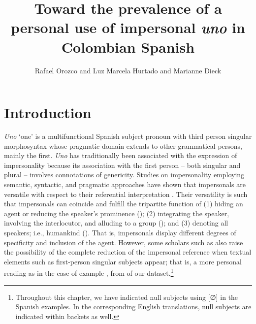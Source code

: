 \documentclass[output=paper]{langscibook}
\author{Rafael Orozco\orcid{0000-0001-9232-0287}\affiliation{Louisiana State University} and Luz Marcela Hurtado\orcid{}\affiliation{Central Michigan University} and Marianne Dieck\orcid{}\affiliation{Universidad de Antioquia}}
\title[Toward the prevalence of a personal use of impersonal \textit{uno} in C.S.]
       {Toward the prevalence of a personal use of impersonal \textit{uno} in Colombian Spanish}
\begin{document}
\maketitle 



\section{Introduction} 


\textit{Uno} ‘one’ is a multifunctional Spanish subject pronoun with third person singular morphosyntax whose pragmatic domain extends to other grammatical persons, mainly the first. \textit{Uno} has traditionally been associated with the expression of impersonality because its association with the first person – both singular and plural – involves connotations of genericity. Studies on impersonality employing semantic, syntactic, and pragmatic approaches have shown that impersonals are versatile with respect to their referential interpretation \parencites[376]{CasiellesSuárez1996}[160]{Hernanz1990}[]{HurtadoGutiérrez-Rivas2016}. Their versatility is such that impersonals can coincide and fulfill the tripartite function of (1) hiding an agent or reducing the speaker’s prominence (\citealt{Barrajón2005, GómezTorrego1992, Haverkate1987, Hernanz1990, HollaenderJensen2002, MuñizCachón1998, RicosVidal2002}); (2) integrating the speaker, involving the interlocutor, and alluding to a group (\citealt{Fernández2008, FernándezRamírez1986, Gelabert-Desnoyer2008, MuñizCachón1998}); and (3) denoting all speakers; i.e., humankind  (\citealt{CompanyPozas2009, FernándezSoriano1999, Siewierska2008}). That is, impersonals display different degrees of specificity and inclusion of the agent. However, some scholars such as \citet[1206]{CompanyPozas2009} also raise the possibility of the complete reduction of the impersonal reference when textual elements such as first-person singular subjects appear; that is, a more personal reading as in the case of example , from of our dataset.\footnote{Throughout this chapter, we have indicated null subjects using [∅] in the Spanish examples. In the corresponding English translations, null subjects are indicated within backets as well.}
\end{document}
